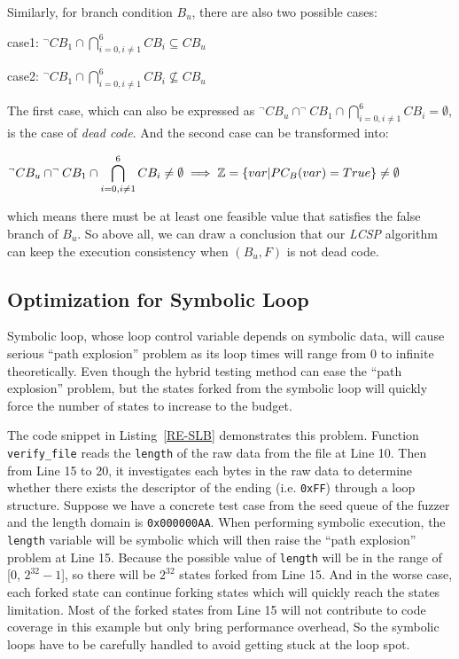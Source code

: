 Similarly, for branch condition $B_u$, there are also two possible cases:
\begin{center}
case1: $\displaystyle ^\neg CB_1 \cap \bigcap\limits_{i=0,i\neq 1}^6 CB_i \subseteq CB_u$

case2: $\displaystyle ^\neg CB_1 \cap \bigcap\limits_{i=0,i\neq 1}^6 CB_i \nsubseteq CB_u$
\end{center}

The first case, which can also be expressed as $^\neg CB_u \cap ^\neg CB_1 \cap \bigcap_{i=0,i\neq 1}^6 CB_i = \emptyset$, is the case of \emph{dead code}. And the second case can be transformed into:
\begin{center}
$\displaystyle ^\neg CB_u \cap ^\neg CB_1 \cap \bigcap\limits_{i=0,i\neq 1}^6 CB_i \neq \emptyset \implies \mathbb{Z} = \{var\arrowvert PC_B(var) = True\} \neq \emptyset$
\end{center}

\noindent which means there must be at least one feasible value that satisfies the false branch of $B_u$. So above all, we can draw a conclusion that our \emph{LCSP} algorithm can keep the execution consistency when $(B_u, F)$ is not dead code.

\subsection{Optimization for Symbolic Loop}
Symbolic loop, whose loop control variable depends on symbolic data, will cause serious ``path explosion'' problem as its loop times will range from 0 to infinite theoretically. 
Even though the hybrid testing method can ease the ``path explosion'' problem, but the states forked from the symbolic loop will quickly force the number of states to increase to the budget. 

 

The code snippet in Listing~\ref{RE-SLB} demonstrates this problem. Function \texttt{verify\_file} reads the \texttt{length} of the raw data from the file at Line 10. Then from Line 15 to 20, it investigates each bytes in the raw data to determine whether there exists the descriptor of the ending (i.e. \texttt{0xFF}) through a loop structure. Suppose we have a concrete test case from the seed queue of the fuzzer and the length domain is \texttt{0x000000AA}. 
When performing symbolic execution, the \texttt{length} variable will be symbolic which will then raise the ``path explosion'' problem at Line 15. Because the possible value of \texttt{length} will be in the range of [0, $2^{32}-1$], so there will be $2^{32}$ states forked from Line 15. And in the worse case, each forked state can continue forking states which will quickly reach the states limitation. 
Most of the forked states from Line 15 will not contribute to code coverage in this example but only bring performance overhead, So the symbolic loops have to be carefully handled to avoid getting stuck at the loop spot. 

